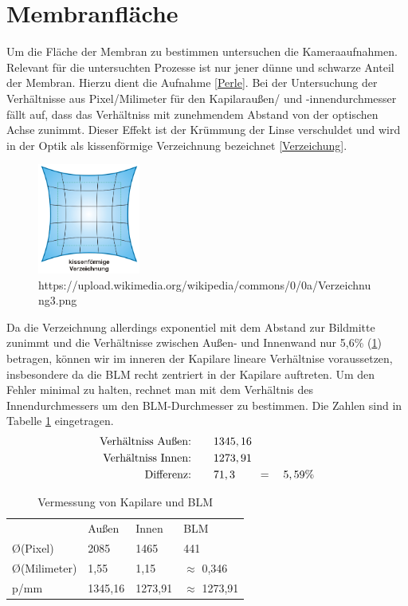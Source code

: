 \documentclass{include/thesisclass3}
\begin{document}
\section{Membranfläche}
Um die Fläche der Membran zu bestimmen untersuchen die Kameraaufnahmen. Relevant für die untersuchten Prozesse ist nur jener dünne und schwarze Anteil der Membran. Hierzu dient die Aufnahme \ref{Perle}. Bei der Untersuchung der Verhältnisse aus Pixel/Milimeter für den Kapilaraußen/ und -innendurchmesser fällt auf, dass das Verhältniss mit zunehmendem Abstand von der optischen Achse zunimmt. Dieser Effekt ist der Krümmung der Linse verschuldet und wird in der Optik als kissenförmige Verzeichnung bezeichnet \ref{Verzeichung}.
\begin{figure}[ht]
	\begin{center}
		\includegraphics[width=0.3\textwidth]{images/Verzeichnung.png}
		\caption{https://upload.wikimedia.org/wikipedia/commons/0/0a/Verzeichnung3.png}
		\label{Verzeichnung}
	\end{center}
\end{figure}
Da die Verzeichnung allerdings exponentiel mit dem Abstand zur Bildmitte zunimmt und die Verhältnisse zwischen Außen- und Innenwand nur 5,6\% (\ref{tab-ratio}) betragen, können wir im inneren der Kapilare lineare Verhältnise voraussetzen, insbesondere da die BLM recht zentriert in der Kapilare auftreten.
Um den Fehler minimal zu halten, rechnet man mit dem Verhältnis des Innendurchmessers um den BLM-Durchmesser zu bestimmen. Die Zahlen sind in Tabelle \ref{tab-ratio} eingetragen.
\begin{align*}
	\text{Verhältniss Au\ss en:\qquad} &1345,16\\
	\text{Verhältniss Innen:\qquad} &1273,91\\
	\text{Differenz:\qquad} & 71,3 \qquad= \quad 5,59\%
\end{align*}
\begin{table}[]
	\centering
	\caption{Vermessung von Kapilare und BLM}
	\label{tab-ratio}
	\begin{tabular}{llll}
		& Au\ss en   & Innen     & BLM     \\
		\O  (Pixel) & 2085    & 1465    & 441     \\
		\O  (Milimeter)       & 1,55    & 1,15    & $\approx$ 0,346   \\
		p/mm            & 1345,16 & 1273,91 & $\approx$ 1273,91
	\end{tabular}
\end{table}
\end{document}
